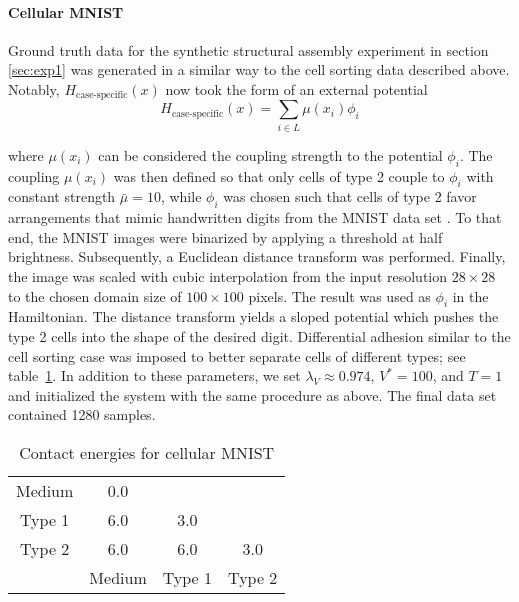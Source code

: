 \paragraph{Cellular MNIST}

Ground truth data for the synthetic structural assembly experiment in section \ref{sec:exp1} was generated in a similar way to the cell sorting data described above. Notably, $H_\text{case-specific}(x)$ now took the form of an external potential
\begin{equation}\label{eq:app-H-external-potential}
    H_\text{case-specific}(x) = \sum_{i \in L} \mu(x_i) \phi_i
\end{equation}

where $\mu(x_i)$ can be considered the coupling strength to the potential $\phi_i$. The coupling $\mu(x_i)$ was then defined so that only cells of type 2 couple to $\phi_i$ with constant strength $\bar{\mu} = 10$, while $\phi_i$ was chosen such that cells of type 2 favor arrangements that mimic handwritten digits from the MNIST data set \cite{deng2012mnist}. To that end, the MNIST images were binarized by applying a threshold at half brightness. Subsequently, a Euclidean distance transform was performed. Finally, the image was scaled with cubic interpolation from the input resolution $28 \times 28$ to the chosen domain size of $100 \times 100$ pixels. The result was used as $\phi_i$ in the Hamiltonian. The distance transform yields a sloped potential which pushes the type 2 cells into the shape of the desired digit. Differential adhesion similar to the cell sorting case was imposed to better separate cells of different types; see table~\ref{tbl:contact_energies_mnist}. In addition to these parameters, we set $\lambda_{V} \approx 0.974$, $V^* = 100$, and $T=1$ and initialized the system with the same procedure as above. The final data set contained 1280 samples.

\begin{table}[h]
\centering
\caption{Contact energies for cellular MNIST}
\label{tbl:contact_energies_mnist}

\begin{tabular}{|*{4}{c|}}
    \cline{1-2}
    Medium & 0.0 \\ \cline{1-3}
    Type 1 & 6.0 & 3.0 \\ \hline
    Type 2 & 6.0 & 6.0 & 3.0 \\ \hline
           & Medium & Type 1 & Type 2 \\ \hline
\end{tabular}
\end{table}



